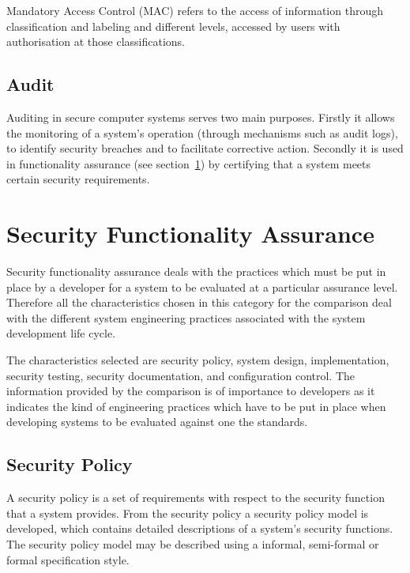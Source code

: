             Mandatory Access Control (MAC) refers to the access of
            information through classification and labeling and
            different levels, accessed by users with authorisation at
            those classifications.

        \subsection{Audit}
            Auditing in secure computer systems serves two main
            purposes. Firstly it allows the monitoring of a system's
            operation (through mechanisms such as audit logs), to
            identify security breaches and to facilitate corrective
            action. Secondly it is used in functionality
            assurance (see section~\ref{functionality-assurance}) by certifying
            that a system meets certain security requirements.

    \section{Security Functionality Assurance}
    \label{functionality-assurance}
    Security functionality assurance deals with the practices which 
    must be put in place by a developer for a system to be evaluated at
    a particular assurance level. Therefore all the characteristics chosen in this
    category for the comparison deal with the different system engineering
    practices associated with the system development life cycle.

    The characteristics selected are security policy, system design,
    implementation, security testing, security documentation, and
    configuration control. The information provided by the comparison is of
    importance to developers as it indicates the kind of engineering practices
    which have to be put in place when developing systems to be evaluated
    against one the standards.
    
        \subsection{Security Policy}
            A security policy is a set of requirements with respect to the 
            security function that a system provides. From the security
            policy a security policy model is developed, which contains
            detailed descriptions of a system's security functions.
            The security policy model may be described using a 
            informal, semi-formal or formal specification style.
            

